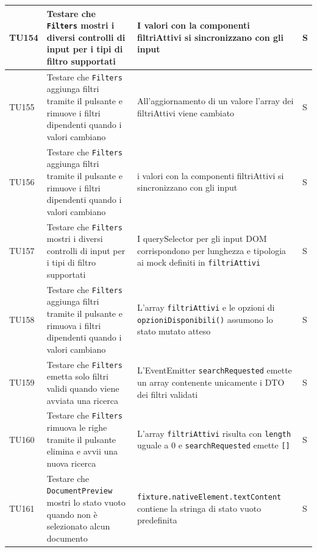 \documentclass[a4paper,12pt]{article}
\begin{document}
\begin{longtable}{|M{1.2cm}|M{5cm}|M{8cm}|M{1.5cm}|}
            TU154 & Testare che \texttt{Filters} mostri i diversi controlli di input per i tipi di filtro supportati & I valori con la componenti filtriAttivi si sincronizzano con gli input & S \\
            \hline

            TU155 & Testare che \texttt{Filters} aggiunga filtri tramite il pulsante e rimuove i filtri dipendenti quando i valori cambiano & All'aggiornamento di un valore l'array dei filtriAttivi viene cambiato & S \\
            \hline

            TU156 & Testare che \texttt{Filters} aggiunga filtri tramite il pulsante e rimuove i filtri dipendenti quando i valori cambiano & i valori con la componenti filtriAttivi si sincronizzano con gli input & S \\
            \hline

            TU157 & Testare che \texttt{Filters} mostri i diversi controlli di input per i tipi di filtro supportati & I querySelector per gli input DOM corrispondono per lunghezza e tipologia ai mock definiti in \texttt{filtriAttivi} & S \\ 
            \hline
            
            TU158 & Testare che \texttt{Filters} aggiunga filtri tramite il pulsante e rimuova i filtri dipendenti quando i valori cambiano & L'array \texttt{filtriAttivi} e le opzioni di \texttt{opzioniDisponibili()} assumono lo stato mutato atteso & S \\ 
            \hline
            
            TU159 & Testare che \texttt{Filters} emetta solo filtri validi quando viene avviata una ricerca & L'EventEmitter \texttt{searchRequested} emette un array contenente unicamente i DTO dei filtri validati & S \\ 
            \hline
            
            TU160 & Testare che \texttt{Filters} rimuova le righe tramite il pulsante elimina e avvii una nuova ricerca & L'array \texttt{filtriAttivi} risulta con \texttt{length} uguale a 0 e \texttt{searchRequested} emette \texttt{[]} & S \\ 
            \hline
            
            TU161 & Testare che \texttt{DocumentPreview} mostri lo stato vuoto quando non è selezionato alcun documento & \texttt{fixture.nativeElement.textContent} contiene la stringa di stato vuoto predefinita & S \\ 
            \hline
            

\end{longtable}
\end{document}
